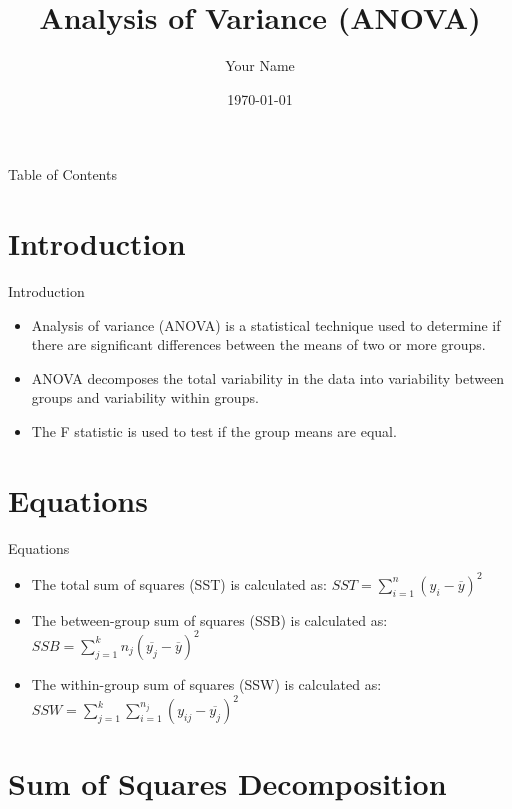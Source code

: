 \documentclass{beamer}
\title{Analysis of Variance (ANOVA)}
\author{Your Name}
\date{\today}
\begin{document}
\begin{frame}
\titlepage
\end{frame}

\begin{frame}{Table of Contents}
    \tableofcontents
\end{frame}

\section{Introduction}
\begin{frame}{Introduction}
    \begin{itemize}
        \item Analysis of variance (ANOVA) is a statistical technique used to determine if there are significant differences between the means of two or more groups.
        \item ANOVA decomposes the total variability in the data into variability between groups and variability within groups.
        \item The F statistic is used to test if the group means are equal.
    \end{itemize}
\end{frame}

\section{Equations}
\begin{frame}{Equations}
    \begin{itemize}
        \item The total sum of squares (SST) is calculated as: $SST = \sum_{i=1}^{n}(y_i-\overline{y})^2$
        \item The between-group sum of squares (SSB) is calculated as: $SSB = \sum_{j=1}^{k}n_j(\overline{y_j}-\overline{y})^2$
        \item The within-group sum of squares (SSW) is calculated as: $SSW = \sum_{j=1}^{k}\sum_{i=1}^{n_j}(y_{ij}-\overline{y_j})^2$
    \end{itemize}
\end{frame}

\section{Sum of Squares Decomposition}
\end{document}
